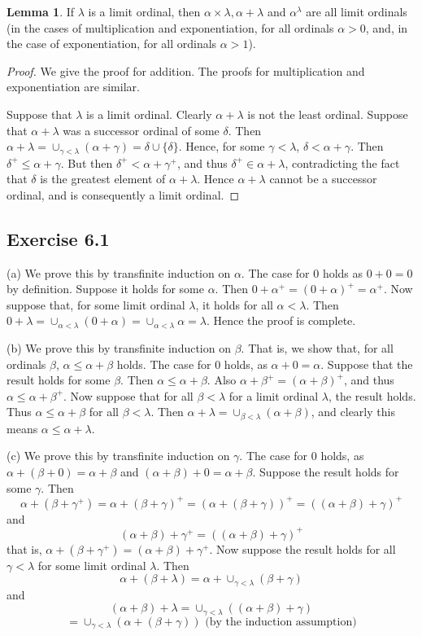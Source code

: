 \documentclass{article}
\theoremstyle{definition}
\newtheorem{lemma}[theorem]{Lemma}
\begin{document}
\begin{lemma}
If $\lambda$ is a limit ordinal, then $\alpha\times\lambda,\alpha+\lambda$ and $\alpha^\lambda$ are all limit ordinals
(in the cases of multiplication and exponentiation, for all ordinals $\alpha>0$, and, in the case of exponentiation, for all ordinals $\alpha>1$).
\end{lemma}
\begin{proof}
We give the proof for addition. The proofs for multiplication and exponentiation are similar.

Suppose that $\lambda$ is a limit ordinal. Clearly $\alpha+\lambda$ is not the least ordinal.
Suppose that $\alpha+\lambda$ was a successor ordinal of some $\delta$. Then
$\alpha+\lambda=\cup_{\gamma<\lambda}(\alpha+\gamma)=\delta\cup\{\delta\}$. Hence, for some
$\gamma<\lambda$, $\delta<\alpha+\gamma$. Then $\delta^+\le\alpha+\gamma$. But then
$\delta^+<\alpha+\gamma^+$, and thus $\delta^+\in\alpha+\lambda$, contradicting the fact that
$\delta$ is the greatest element of $\alpha+\lambda$. Hence $\alpha+\lambda$ cannot be a successor
ordinal, and is consequently a limit ordinal.
\end{proof}

\subsection*{Exercise 6.1}
(a) We prove this by transfinite induction on $\alpha$. The case for $0$ holds as $0+0=0$ by definition. Suppose it holds for some 
$\alpha$. Then $0+\alpha^+=(0+\alpha)^+=\alpha^+$. Now suppose that, for some limit ordinal $\lambda$, it holds for all 
$\alpha<\lambda$. Then $0+\lambda=\cup_{\alpha<\lambda}(0+\alpha)=\cup_{\alpha<\lambda}\alpha=\lambda$. Hence the proof is complete.

(b) We prove this by transfinite induction on $\beta$. That is, we show that, for all ordinals $\beta$,
$\alpha\le\alpha+\beta$ holds. The case for $0$ holds, as $\alpha+0=\alpha$. Suppose that the result holds for some 
$\beta$. Then $\alpha\le\alpha+\beta$. Also $\alpha+\beta^+=(\alpha+\beta)^+$, and thus 
$\alpha\le\alpha+\beta^+$. Now suppose that for all $\beta<\lambda$ for a limit ordinal $\lambda$, the result holds. 
Thus $\alpha\le\alpha+\beta$ for all $\beta<\lambda$. Then $\alpha+\lambda=\cup_{\beta<\lambda}(\alpha+\beta)$, and clearly 
this means $\alpha\le\alpha+\lambda$.

(c) We prove this by transfinite induction on $\gamma$. The case for $0$ holds, as 
$\alpha+(\beta+0)=\alpha+\beta$ and $(\alpha+\beta)+0=\alpha+\beta$. Suppose the result holds for some 
$\gamma$. Then 
\[ \alpha+(\beta+\gamma^+)=\alpha+(\beta+\gamma)^+=(\alpha+(\beta+\gamma))^+=((\alpha+\beta)+\gamma)^+ \]
and \[ (\alpha+\beta)+\gamma^+=((\alpha+\beta)+\gamma)^+ \] that is, $\alpha+(\beta+\gamma^+)=(\alpha+\beta)+\gamma^+$.
Now suppose the result holds for all $\gamma<\lambda$ for some limit ordinal $\lambda$. Then 
\[ \alpha+(\beta+\lambda)=\alpha+\cup_{\gamma<\lambda}(\beta+\gamma) \] and
\[ (\alpha+\beta)+\lambda=\cup_{\gamma<\lambda}((\alpha+\beta)+\gamma) \]
\[ =\cup_{\gamma<\lambda}(\alpha+(\beta+\gamma))\textrm{ (by the induction assumption)} \]
\end{document}

